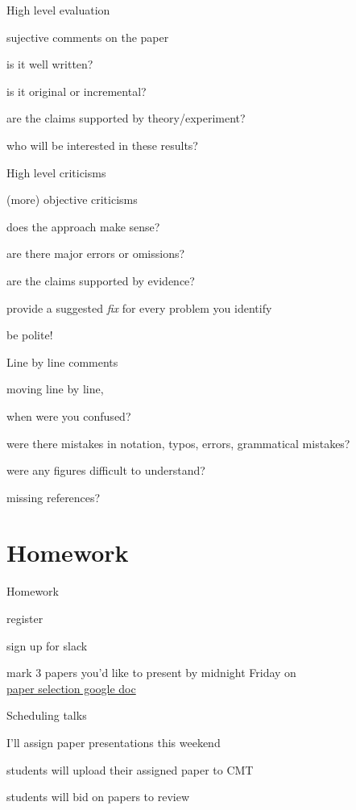 \documentclass[presentation,xcolor={usenames,dvipsnames}]{beamer}
\begin{document}
\begin{frame}{High level evaluation}

sujective comments on the paper
\bit
\item is it well written?
\item is it original or incremental?
\item are the claims supported by theory/experiment?
\item who will be interested in these results?
\eit

\end{frame}

\begin{frame}{High level criticisms}

(more) objective criticisms
\bit
\item does the approach make sense?
\item are there major errors or omissions?
\item are the claims supported by evidence?
\item provide a suggested \emph{fix} for every problem you identify
\item be polite!
\eit

\end{frame}

\begin{frame}{Line by line comments}

moving line by line,
\bit
\item when were you confused?
\item were there mistakes in notation, typos, errors, grammatical mistakes?
\item were any figures difficult to understand?
\item missing references?
\eit

\end{frame}

\section{Homework}

\begin{frame}{Homework}

\bit
\item register
\item sign up for slack
\item mark 3 papers you'd like to present by midnight Friday on \\
\href{https://docs.google.com/spreadsheets/d/1eSJn0_ANEXfOsZZrYwHoQ6F00FKBLz4olbKVtOLoE40}{paper selection google doc}
\eit

\end{frame}

\begin{frame}{Scheduling talks}

\bit
\item I'll assign paper presentations this weekend
\item students will upload their assigned paper to CMT
\item students will bid on papers to review
\eit

\end{frame}
\end{document}
